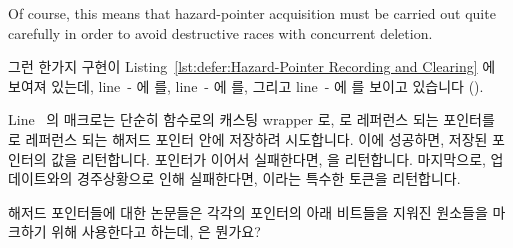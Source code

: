 Of course, this means that hazard-pointer acquisition must be carried
out quite carefully in order to avoid destructive races with concurrent
deletion.
\fi
\begin{lineref}
그런 한가지 구현이
Listing~\ref{lst:defer:Hazard-Pointer Recording and Clearing} 에 보여져 있는데,
line~- 에  를,
line~- 에  를, 그리고
line~- 에  를 보이고 있습니다
().

Line~ 의  매크로는 단순히 
함수로의 캐스팅 wrapper 로,  로 레퍼런스 되는 포인터를  로
레퍼런스 되는 해저드 포인터 안에 저장하려 시도합니다.
이에 성공하면, 저장된 포인터의 값을 리턴합니다.
포인터가  이어서 실패한다면,  을 리턴합니다.
마지막으로, 업데이트와의 경주상황으로 인해 실패한다면, 
이라는 특수한 토큰을 리턴합니다.

\QuickQuiz{}
	해저드 포인터들에 대한 논문들은 각각의 포인터의 아래 비트들을 지워진
	원소들을 마크하기 위해 사용한다고 하는데,  은 뭔가요?

{}
\end{lineref}
